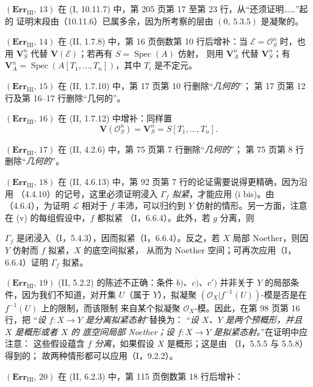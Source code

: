 \documentclass[UTF8,fontset=none,11pt,oneside,openany]{ctexbook}
\newcommand{\oldpage}[2][]{%
  \hypertarget{ega-source-page-#1-#2}{}%
  \marginnote{\scriptsize\textbf{#1}~|~#2}\ignorespaces}
\begin{document}
\noindent\textbf{$(\mathbf{Err}_{\mathrm{III}},\,13)$} 在
(I, 10.11.7) 中，第 205 页第 17 至第 23 行，从“还须证明……”起的
证明末段由（10.11.6）已属多余，因为所考察的层由 $(0,\,5.3.5)$
是凝聚的。

\noindent\textbf{$(\mathbf{Err}_{\mathrm{III}},\,14)$} 在
(II, 1.7.8) 中，第 16 页倒数第 10 行后增补：当
$\mathscr E=\mathscr O_S^n$ 时，也用 $\mathbf V_S^n$ 代替
$\mathbf V(\mathscr E)$；若再有 $S=\operatorname{Spec}(A)$ 仿射，
则用 $\mathbf V_A^n$ 代替 $\mathbf V_S^n$；有
$\mathbf V_A^n=\operatorname{Spec}(A[T_1,\ldots,T_n])$，其中
$T_i$ 是不定元。

\noindent\textbf{$(\mathbf{Err}_{\mathrm{III}},\,15)$} 在
(II, 1.7.10) 中，第 17 页第 10 行删除“\emph{几何的}”；
第 17 页第 12 行及第 16--17 行删除“几何的”。

\noindent\textbf{$(\mathbf{Err}_{\mathrm{III}},\,16)$} 在
(II, 1.7.12) 中增补：同样置
\[
  \mathbf V(\mathscr O_S^n)=\mathbf V_S^n=S[T_1,\ldots,T_n].
\]

\noindent\textbf{$(\mathbf{Err}_{\mathrm{III}},\,17)$} 在
(II, 4.2.6) 中，第 75 页第 7 行删除“\emph{几何的}”；
第 75 页第 8 行删除“\emph{几何的}”。

\noindent\textbf{$(\mathbf{Err}_{\mathrm{III}},\,18)$} 在
(II, 4.6.13) 中，第 92 页第 7 行的论证需要说得更精确，因为沿用
（4.4.10）的记号，这里必须证明浸入 $\Gamma_f$ \emph{拟紧}，才能应用
(i bis)。由（4.6.4），为证明 $\mathscr L$ 相对于 $f$ 丰沛，可以归约到
$Y$ 仿射的情形。另一方面，注意在 (v) 的每组假设中，$f$ 都拟紧
（I，6.6.4）。此外，若 $g$ 分离，则

\oldpage[III]{221}
$\Gamma_f$ 是闭浸入（I，5.4.3），因而拟紧（I，6.6.4）。反之，若
$X$ 局部 Noether，则因 $Y$ 仿射而 $f$ 拟紧，$X$ 的底空间拟紧，
从而为 Noether 空间；可再次应用（I，6.6.4）证明 $\Gamma_f$ 拟紧。

\noindent\textbf{$(\mathbf{Err}_{\mathrm{III}},\,19)$}
(II, 5.2.2) 的陈述不正确：条件 $b)$、$c)$、$c')$ 并非关于
$Y$ 的局部条件，因为我们不知道，对开集 $U$（属于 $Y$），拟凝聚
$(\mathscr O_X|f^{-1}(U))$-模是否是在 $f^{-1}(U)$ 上的限制，而该限制
来自某个拟凝聚 $\mathscr O_X$-模。因此，在第 98 页第 16 行，把
“\emph{设 $f:X\to Y$ 是分离拟紧态射}”替换为：
“\emph{设 $X$、$Y$ 是两个预概形，并且 $X$ 是概形或者 $X$ 的
底空间局部 Noether；设 $f:X\to Y$ 是拟紧态射。}”在证明中应注意：
这些假设蕴含 $f$ \emph{分离}，如果假设 $X$ 是概形；这是由
（I，5.5.5 与 5.5.8）得到的；
故两种情形都可以应用（I，9.2.2）。

\noindent\textbf{$(\mathbf{Err}_{\mathrm{III}},\,20)$} 在
(II, 6.2.3) 中，第 115 页倒数第 18 行后增补：
\end{document}
